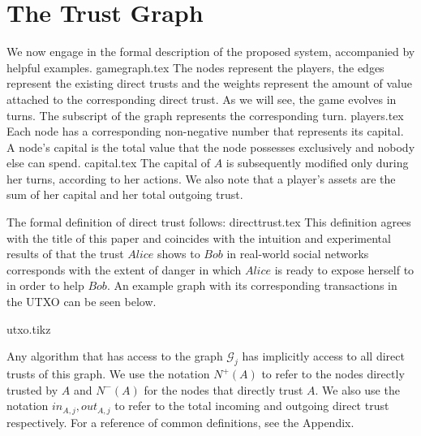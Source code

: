   \section{The Trust Graph}
     We now engage in the formal description of the proposed system, accompanied by helpful examples.
     {gamegraph.tex}
     The nodes represent the players, the edges represent the existing direct trusts and the weights represent the amount of
     value attached to the corresponding direct trust. As we will see, the game evolves in turns. The subscript of the graph
     represents the corresponding turn.
     {players.tex}
     Each node has a corresponding non-negative number that represents its capital. A node's capital is the total value that
     the node possesses exclusively and nobody else can spend.
     {capital.tex}
     The capital of $A$ is subsequently modified only during her turns, according to her actions. We also note that a
     player's assets are the sum of her capital and her total outgoing trust.

     The formal definition of direct trust follows:
     {directtrust.tex}
     This definition agrees with the title of this paper and coincides with the intuition and experimental results of
     \cite{kmrs} that the trust $Alice$ shows to $Bob$ in real-world social networks corresponds with the extent
     of danger in which $Alice$ is ready to expose herself to in order to help $Bob$. An example graph with its corresponding
     transactions in the UTXO can be seen below.

     {utxo.tikz}

     Any algorithm that has access to the graph $\mathcal{G}_j$ has implicitly access to all direct trusts of this graph.
     We use the notation $N^{+}(A)$ to refer to the nodes directly trusted by $A$ and $N^{-}(A)$ for the nodes that directly
     trust $A$. We also use the notation $in_{A, j}, out_{A, j}$ to refer to the total incoming and outgoing direct trust
     respectively. For a reference of common definitions, see the Appendix.
